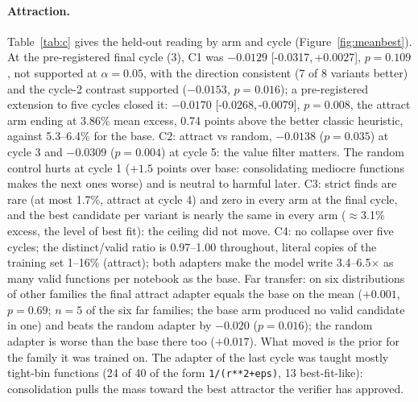 \documentclass[11pt]{article}
\newcommand{\ci}[2]{[#1,\,#2]}
\begin{document}
\paragraph{Attraction.} Table~\ref{tab:c} gives the held-out reading by arm
and cycle (Figure~\ref{fig:meanbest}). At the pre-registered final cycle (3), C1 was $-0.0129$
\ci{-0.0317}{+0.0027}, $p=0.109$, not supported at $\alpha=0.05$, with the
direction consistent (7 of 8 variants better) and the cycle-2 contrast
supported ($-0.0153$, $p=0.016$); a pre-registered extension to five cycles
closed it: $-0.0170$ \ci{-0.0268}{-0.0079}, $p=0.008$, the attract arm
ending at 3.86\% mean excess, 0.74 points above the better classic
heuristic, against 5.3--6.4\% for the base. C2: attract vs random,
$-0.0138$ ($p=0.035$) at cycle 3 and $-0.0309$ ($p=0.004$) at cycle 5: the
value filter matters. The random control hurts at cycle 1 ($+1.5$ points
over base: consolidating mediocre functions makes the next ones worse) and
is neutral to harmful later. C3: strict finds are rare (at most 1.7\%,
attract at cycle 4) and zero in every arm at the final cycle, and the
best candidate per variant is nearly the same in every arm
($\approx$3.1\% excess, the level of best fit): the ceiling did not move.
C4: no collapse over five cycles; the distinct/valid ratio is 0.97--1.00
throughout, literal copies of the training set 1--16\% (attract); both
adapters make the model write 3.4--6.5$\times$ as many valid functions
per notebook as the base.
Far transfer: on six distributions of other families the final attract
adapter equals the base on the mean ($+0.001$, $p=0.69$; $n=5$ of the six
far families; the base arm produced no valid candidate in one) and beats
the random adapter by $-0.020$ ($p=0.016$); the random adapter is worse
than the base there too ($+0.017$). What moved is the prior for the family
it was trained on. The adapter of the last cycle was taught mostly
tight-bin functions (24 of 40 of the form \texttt{1/(r**2+eps)}, 13
best-fit-like): consolidation pulls the mass toward the best attractor the
verifier has approved.
\end{document}
